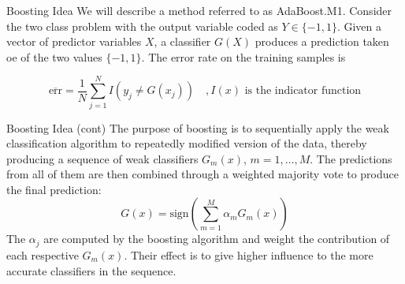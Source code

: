 \documentclass{beamer}
\begin{document}
\begin{frame}{Boosting Idea}
	We will describe a method referred to as AdaBoost.M1. Consider the two class problem with the output variable coded as $Y\in \{-1,1\}$. Given a vector of predictor variables $X$, a classifier $G(X)$ produces a prediction taken oe of the two values $\{-1,1\}$. The error rate on the training samples is
	
	\begin{equation*}
		\overline{\text{err}}= \frac{1}{N} \sum_{j=1}^N I(y_j\ne G(x_j)) \quad ,I(x) \text{ is the indicator function}
	\end{equation*}

\end{frame}

\begin{frame}{Boosting Idea (cont)}
The purpose of boosting is to sequentially apply the weak classification algorithm to repeatedly modified version of the data, thereby producing a sequence of weak classifiers $G_m(x)$, $m=1,\ldots, M$. The predictions from all of them are then combined through a weighted majority vote to produce the final prediction:
\begin{equation*}
	G(x)= \text{sign}\left( \sum_{m=1}^M \alpha_m G_m (x) \right)
\end{equation*}
The $\alpha_j$ are computed by the boosting algorithm and weight the contribution of each respective $G_m(x)$. Their effect is to give higher influence to the more accurate classifiers in the sequence. 

\end{frame}
\end{document}
